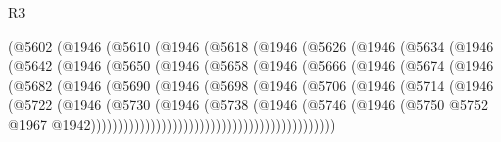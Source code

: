 \begin{lexlean}{R3}
\begin{coremodule}
                (@5602
                  (@1946
                    (@5610
                      (@1946
                        (@5618
                          (@1946
                            (@5626
                              (@1946
                                (@5634
                                  (@1946
                                    (@5642
                                      (@1946
                                        (@5650
                                          (@1946
                                            (@5658
                                              (@1946
                                                (@5666
                                                  (@1946
                                                    (@5674
                                                      (@1946
                                                        (@5682
                                                          (@1946
                                                            (@5690
                                                              (@1946
                                                                (@5698
                                                                  (@1946
                                                                    (@5706
                                                                      (@1946
                                                                        (@5714
                                                                          (@1946
                                                                            (@5722
                                                                              (@1946
                                                                                (@5730
                                                                                  (@1946
                                                                                    (@5738
                                                                                      (@1946
                                                                                        (@5746
                                                                                          (@1946
                                                                                            (@5750
                                                                                              @5752
                                                                                              @1967
                                                                                              @1942)))))))))))))))))))))))))))))))))))))))))))))

\end{coremodule}
\end{lexlean}
